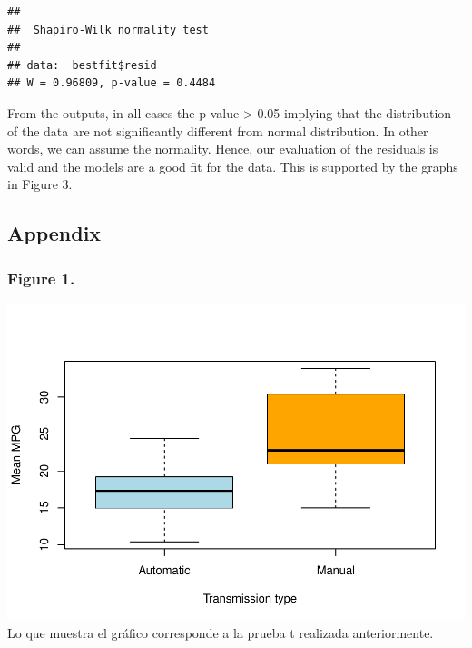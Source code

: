 \documentclass[]{article}
\newenvironment{Shaded}{\begin{snugshade}}{\end{snugshade}}
\newcommand{\DataTypeTok}[1]{\textcolor[rgb]{0.13,0.29,0.53}{#1}}
\newcommand{\KeywordTok}[1]{\textcolor[rgb]{0.13,0.29,0.53}{\textbf{#1}}}
\newcommand{\NormalTok}[1]{#1}
\newcommand{\OperatorTok}[1]{\textcolor[rgb]{0.81,0.36,0.00}{\textbf{#1}}}
\newcommand{\StringTok}[1]{\textcolor[rgb]{0.31,0.60,0.02}{#1}}
\begin{document}
\begin{verbatim}
## 
##  Shapiro-Wilk normality test
## 
## data:  bestfit$resid
## W = 0.96809, p-value = 0.4484
\end{verbatim}

From the outputs, in all cases the p-value \textgreater{} 0.05 implying
that the distribution of the data are not significantly different from
normal distribution. In other words, we can assume the normality. Hence,
our evaluation of the residuals is valid and the models are a good fit
for the data. This is supported by the graphs in Figure 3.

\hypertarget{appendix}{%
\subsection{Appendix}\label{appendix}}

\hypertarget{figure-1.}{%
\subsubsection{Figure 1.}\label{figure-1.}}

\begin{Shaded}
\end{Shaded}

\includegraphics{Motor_Trend_Data_Analysis_Final_Project_files/figure-latex/unnamed-chunk-9-1.pdf}
Lo que muestra el gráfico corresponde a la prueba t realizada
anteriormente.
\end{document}
